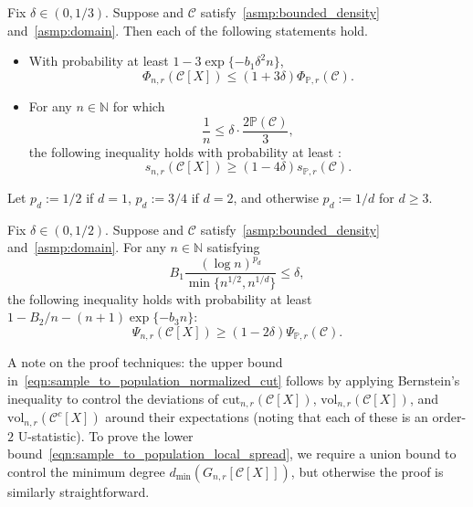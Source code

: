 \documentclass[twoside,11pt]{article}
\newcommand{\1}{\mathbf{1}}
\newcommand{\mc}[1]{\mathcal{#1}}
\newcommand{\mbb}[1]{\mathbb{#1}}
\newcommand{\Pbb}{\mathbb{P}}
\newcommand{\wt}[1]{\widetilde{#1}}
\newcommand{\vol}{\mathrm{vol}}
\newcommand{\cut}{\mathrm{cut}}
\begin{document}
\begin{proposition}
	\label{prop:sample_to_population_1}
	Fix $\delta \in (0,1/3)$. Suppose \smash{$\wt{\Pbb}$} and $\mc{C}$ satisfy~\ref{asmp:bounded_density} and~\ref{asmp:domain}. Then each of the following statements hold.
	\begin{itemize}
		\item With probability at least $1 - 3\exp\{-b_1\delta^2n\}$,
		\begin{equation}
		\label{eqn:sample_to_population_normalized_cut}
		\Phi_{n,r}(\mc{C}[X]) \leq (1 + 3\delta) \Phi_{\Pbb,r}(\mc{C}).
		\end{equation}
		\item For any $n \in \mbb{N}$ for which 
		\begin{equation}
		\label{eqn:sample_to_population_local_spread_sample_complexity}
		\frac{1}{n} \leq \delta \cdot \frac{2\Pbb(\mc{C})}{3},
		\end{equation}
		the following inequality holds with probability at least :
		\begin{equation}
		\label{eqn:sample_to_population_local_spread}
		s_{n,r}(\mc{C}[X]) \geq (1 - 4\delta) s_{\Pbb,r}(\mc{C}).
		\end{equation}
	\end{itemize}
\end{proposition}
Let $p_d := 1/2$ if $d = 1$, $p_d := 3/4$ if $d = 2$, and otherwise $p_d := 1/d$ for $d \geq 3$. 
\begin{proposition}
	\label{prop:sample_to_population_2}
	Fix $\delta \in (0,1/2)$. Suppose \smash{$\wt{\Pbb}$} and $\mc{C}$ satisfy~\ref{asmp:bounded_density} and~\ref{asmp:domain}. For any $n \in \mbb{N}$ satisfying
	\begin{equation}
	\label{eqn:sample_to_population_conductance_sample_complexity}
	B_1 \frac{(\log n)^{p_d}}{\min\{n^{1/2},n^{1/d}\}} \leq \delta,
	\end{equation}
	the following inequality holds with probability at least $1 - B_2/n - (n + 1)\exp\{-b_3n\}$:
	\begin{equation}
	\label{eqn:sample_to_population_conductance}
	\Psi_{n,r}(\mc{C}[X]) \geq (1 - 2\delta) \Psi_{\Pbb,r}(\mc{C}).
	\end{equation}
\end{proposition}

A note on the proof techniques: the upper bound in~\eqref{eqn:sample_to_population_normalized_cut} follows by applying Bernstein's inequality to control the deviations of $\cut_{n,r}(\mc{C}[X])$, $\vol_{n,r}(\mc{C}[X])$, and $\vol_{n,r}(\mc{C}^c[X])$ around their expectations (noting that each of these is an order-$2$ U-statistic). To prove the lower bound~\eqref{eqn:sample_to_population_local_spread}, we require a union bound to control the minimum degree $d_{\min}(G_{n,r}[\mc{C}[X]])$, but otherwise the proof is similarly straightforward. 
\end{document}
